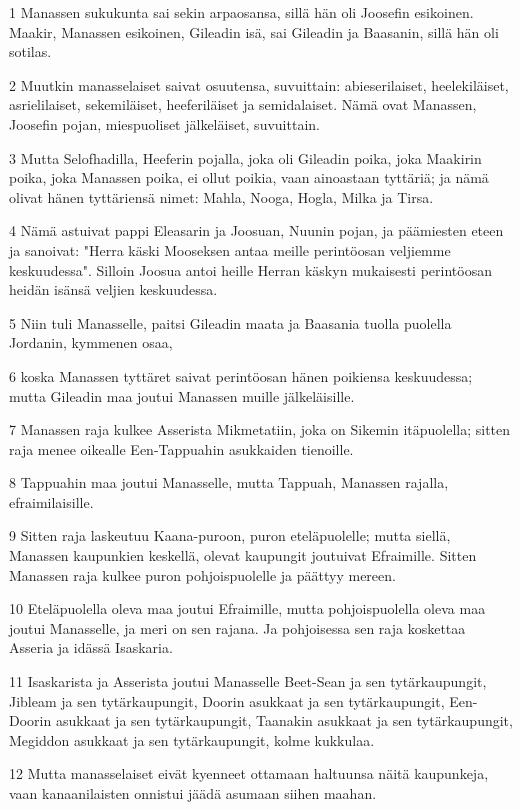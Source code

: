 \par 1 Manassen sukukunta sai sekin arpaosansa, sillä hän oli Joosefin esikoinen. Maakir, Manassen esikoinen, Gileadin isä, sai Gileadin ja Baasanin, sillä hän oli sotilas.
\par 2 Muutkin manasselaiset saivat osuutensa, suvuittain: abieserilaiset, heelekiläiset, asrielilaiset, sekemiläiset, heeferiläiset ja semidalaiset. Nämä ovat Manassen, Joosefin pojan, miespuoliset jälkeläiset, suvuittain.
\par 3 Mutta Selofhadilla, Heeferin pojalla, joka oli Gileadin poika, joka Maakirin poika, joka Manassen poika, ei ollut poikia, vaan ainoastaan tyttäriä; ja nämä olivat hänen tyttäriensä nimet: Mahla, Nooga, Hogla, Milka ja Tirsa.
\par 4 Nämä astuivat pappi Eleasarin ja Joosuan, Nuunin pojan, ja päämiesten eteen ja sanoivat: "Herra käski Mooseksen antaa meille perintöosan veljiemme keskuudessa". Silloin Joosua antoi heille Herran käskyn mukaisesti perintöosan heidän isänsä veljien keskuudessa.
\par 5 Niin tuli Manasselle, paitsi Gileadin maata ja Baasania tuolla puolella Jordanin, kymmenen osaa,
\par 6 koska Manassen tyttäret saivat perintöosan hänen poikiensa keskuudessa; mutta Gileadin maa joutui Manassen muille jälkeläisille.
\par 7 Manassen raja kulkee Asserista Mikmetatiin, joka on Sikemin itäpuolella; sitten raja menee oikealle Een-Tappuahin asukkaiden tienoille.
\par 8 Tappuahin maa joutui Manasselle, mutta Tappuah, Manassen rajalla, efraimilaisille.
\par 9 Sitten raja laskeutuu Kaana-puroon, puron eteläpuolelle; mutta siellä, Manassen kaupunkien keskellä, olevat kaupungit joutuivat Efraimille. Sitten Manassen raja kulkee puron pohjoispuolelle ja päättyy mereen.
\par 10 Eteläpuolella oleva maa joutui Efraimille, mutta pohjoispuolella oleva maa joutui Manasselle, ja meri on sen rajana. Ja pohjoisessa sen raja koskettaa Asseria ja idässä Isaskaria.
\par 11 Isaskarista ja Asserista joutui Manasselle Beet-Sean ja sen tytärkaupungit, Jibleam ja sen tytärkaupungit, Doorin asukkaat ja sen tytärkaupungit, Een-Doorin asukkaat ja sen tytärkaupungit, Taanakin asukkaat ja sen tytärkaupungit, Megiddon asukkaat ja sen tytärkaupungit, kolme kukkulaa.
\par 12 Mutta manasselaiset eivät kyenneet ottamaan haltuunsa näitä kaupunkeja, vaan kanaanilaisten onnistui jäädä asumaan siihen maahan.
